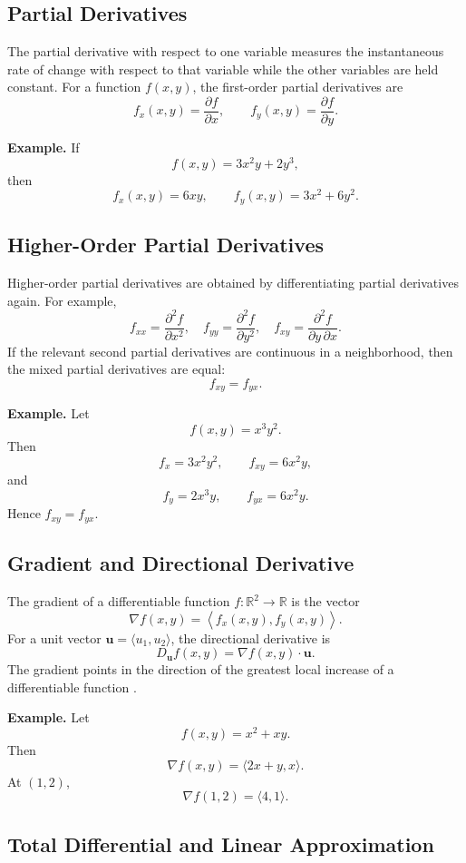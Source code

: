 \documentclass[a4paper,12pt]{article}
\theoremstyle{mystyle}
\numberwithin{equation}{section}
\numberwithin{theorem}{section}
\numberwithin{proposition}{section}
\numberwithin{example}{section}
\numberwithin{remark}{section}
\numberwithin{lemma}{section}
\numberwithin{corollary}{section}
\numberwithin{definition}{section}
\begin{document}
\subsection{Partial Derivatives}

The partial derivative with respect to one variable measures the
instantaneous rate of change with respect to that variable while the
other variables are held constant. For a function \(f(x,y)\), the
first-order partial derivatives are
\[
f_x(x,y)=\frac{\partial f}{\partial x},
\qquad
f_y(x,y)=\frac{\partial f}{\partial y}.
\]

\textbf{Example.} If
\[
f(x,y)=3x^{2}y+2y^{3},
\]
then
\[
f_x(x,y)=6xy,\qquad
f_y(x,y)=3x^{2}+6y^{2}.
\]

\subsection{Higher-Order Partial Derivatives}

Higher-order partial derivatives are obtained by differentiating
partial derivatives again. For example,
\[
f_{xx}=\frac{\partial^{2}f}{\partial x^{2}},
\quad
f_{yy}=\frac{\partial^{2}f}{\partial y^{2}},
\quad
f_{xy}=\frac{\partial^{2}f}{\partial y\,\partial x}.
\]
If the relevant second partial derivatives are continuous in a
neighborhood, then the mixed partial derivatives are equal:
\[
f_{xy}=f_{yx}.
\]

\textbf{Example.} Let
\[
f(x,y)=x^{3}y^{2}.
\]
Then
\[
f_x=3x^{2}y^{2},
\qquad
f_{xy}=6x^{2}y,
\]
and
\[
f_y=2x^{3}y,
\qquad
f_{yx}=6x^{2}y.
\]
Hence \(f_{xy}=f_{yx}\).

\subsection{Gradient and Directional Derivative}

The gradient of a differentiable function \(f:\mathbb{R}^{2}\to
\mathbb{R}\) is the vector
\[
\nabla f(x,y)=
\left\langle f_x(x,y),f_y(x,y)\right\rangle.
\]
For a unit vector \(\mathbf{u}=\langle u_1,u_2\rangle\), the
directional derivative is
\[
D_{\mathbf{u}}f(x,y)=\nabla f(x,y)\cdot\mathbf{u}.
\]
The gradient points in the direction of the greatest local increase
of a differentiable function \cite{openstaxgradient}.

\textbf{Example.} Let
\[
f(x,y)=x^{2}+xy.
\]
Then
\[
\nabla f(x,y)=\langle 2x+y,x\rangle.
\]
At \((1,2)\),
\[
\nabla f(1,2)=\langle 4,1\rangle.
\]

\subsection{Total Differential and Linear Approximation}
\end{document}
